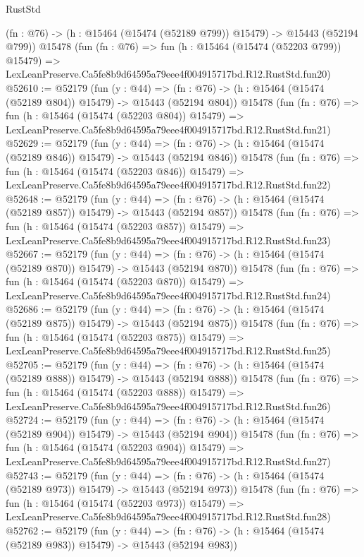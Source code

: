 \begin{lexlean}{RustStd}
\begin{coremodule}
    (fn : @76) -> (h : @15464 (@15474 (@52189 @799)) @15479) -> @15443 (@52194 @799))
    @15478
    (fun (fn : @76) =>
    fun (h : @15464 (@15474 (@52203 @799)) @15479) =>
    LexLeanPreserve.Ca5fe8b9d64595a79eee4f004915717bd.R12.RustStd.fun20)
@52610 := @52179
    (fun (y : @44) =>
    (fn : @76) -> (h : @15464 (@15474 (@52189 @804)) @15479) -> @15443 (@52194 @804))
    @15478
    (fun (fn : @76) =>
    fun (h : @15464 (@15474 (@52203 @804)) @15479) =>
    LexLeanPreserve.Ca5fe8b9d64595a79eee4f004915717bd.R12.RustStd.fun21)
@52629 := @52179
    (fun (y : @44) =>
    (fn : @76) -> (h : @15464 (@15474 (@52189 @846)) @15479) -> @15443 (@52194 @846))
    @15478
    (fun (fn : @76) =>
    fun (h : @15464 (@15474 (@52203 @846)) @15479) =>
    LexLeanPreserve.Ca5fe8b9d64595a79eee4f004915717bd.R12.RustStd.fun22)
@52648 := @52179
    (fun (y : @44) =>
    (fn : @76) -> (h : @15464 (@15474 (@52189 @857)) @15479) -> @15443 (@52194 @857))
    @15478
    (fun (fn : @76) =>
    fun (h : @15464 (@15474 (@52203 @857)) @15479) =>
    LexLeanPreserve.Ca5fe8b9d64595a79eee4f004915717bd.R12.RustStd.fun23)
@52667 := @52179
    (fun (y : @44) =>
    (fn : @76) -> (h : @15464 (@15474 (@52189 @870)) @15479) -> @15443 (@52194 @870))
    @15478
    (fun (fn : @76) =>
    fun (h : @15464 (@15474 (@52203 @870)) @15479) =>
    LexLeanPreserve.Ca5fe8b9d64595a79eee4f004915717bd.R12.RustStd.fun24)
@52686 := @52179
    (fun (y : @44) =>
    (fn : @76) -> (h : @15464 (@15474 (@52189 @875)) @15479) -> @15443 (@52194 @875))
    @15478
    (fun (fn : @76) =>
    fun (h : @15464 (@15474 (@52203 @875)) @15479) =>
    LexLeanPreserve.Ca5fe8b9d64595a79eee4f004915717bd.R12.RustStd.fun25)
@52705 := @52179
    (fun (y : @44) =>
    (fn : @76) -> (h : @15464 (@15474 (@52189 @888)) @15479) -> @15443 (@52194 @888))
    @15478
    (fun (fn : @76) =>
    fun (h : @15464 (@15474 (@52203 @888)) @15479) =>
    LexLeanPreserve.Ca5fe8b9d64595a79eee4f004915717bd.R12.RustStd.fun26)
@52724 := @52179
    (fun (y : @44) =>
    (fn : @76) -> (h : @15464 (@15474 (@52189 @904)) @15479) -> @15443 (@52194 @904))
    @15478
    (fun (fn : @76) =>
    fun (h : @15464 (@15474 (@52203 @904)) @15479) =>
    LexLeanPreserve.Ca5fe8b9d64595a79eee4f004915717bd.R12.RustStd.fun27)
@52743 := @52179
    (fun (y : @44) =>
    (fn : @76) -> (h : @15464 (@15474 (@52189 @973)) @15479) -> @15443 (@52194 @973))
    @15478
    (fun (fn : @76) =>
    fun (h : @15464 (@15474 (@52203 @973)) @15479) =>
    LexLeanPreserve.Ca5fe8b9d64595a79eee4f004915717bd.R12.RustStd.fun28)
@52762 := @52179
    (fun (y : @44) =>
    (fn : @76) -> (h : @15464 (@15474 (@52189 @983)) @15479) -> @15443 (@52194 @983))

\end{coremodule}
\end{lexlean}
